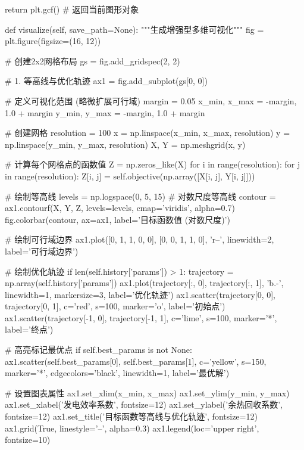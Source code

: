 \documentclass[a4paper,12pt]{article}
\begin{document}
\begin{python}
        return plt.gcf()  # 返回当前图形对象

    def visualize(self, save_path=None):
        """生成增强型多维可视化"""
        fig = plt.figure(figsize=(16, 12))
        
        # 创建2x2网格布局
        gs = fig.add_gridspec(2, 2)
        
        # 1. 等高线与优化轨迹
        ax1 = fig.add_subplot(gs[0, 0])
        
        # 定义可视化范围 (略微扩展可行域)
        margin = 0.05
        x_min, x_max = -margin, 1.0 + margin
        y_min, y_max = -margin, 1.0 + margin
        
        # 创建网格
        resolution = 100
        x = np.linspace(x_min, x_max, resolution)
        y = np.linspace(y_min, y_max, resolution)
        X, Y = np.meshgrid(x, y)
        
        # 计算每个网格点的函数值
        Z = np.zeros_like(X)
        for i in range(resolution):
            for j in range(resolution):
                Z[i, j] = self.objective(np.array([X[i, j], Y[i, j]]))
        
        # 绘制等高线
        levels = np.logspace(0, 5, 15)  # 对数尺度等高线
        contour = ax1.contourf(X, Y, Z, levels=levels, cmap='viridis', alpha=0.7)
        fig.colorbar(contour, ax=ax1, label='目标函数值 (对数尺度)')
        
        # 绘制可行域边界
        ax1.plot([0, 1, 1, 0, 0], [0, 0, 1, 1, 0], 'r--', linewidth=2, label='可行域边界')
        
        # 绘制优化轨迹
        if len(self.history['params']) > 1:
            trajectory = np.array(self.history['params'])
            ax1.plot(trajectory[:, 0], trajectory[:, 1], 'b.-', linewidth=1, markersize=3, label='优化轨迹')
            ax1.scatter(trajectory[0, 0], trajectory[0, 1], c='red', s=100, marker='o', label='初始点')
            ax1.scatter(trajectory[-1, 0], trajectory[-1, 1], c='lime', s=100, marker='*', label='终点')
            
            # 高亮标记最优点
            if self.best_params is not None:
                ax1.scatter(self.best_params[0], self.best_params[1], c='yellow', s=150, 
                           marker='*', edgecolors='black', linewidth=1, label='最优解')
        
        # 设置图表属性
        ax1.set_xlim(x_min, x_max)
        ax1.set_ylim(y_min, y_max)
        ax1.set_xlabel('发电效率系数', fontsize=12)
        ax1.set_ylabel('余热回收系数', fontsize=12)
        ax1.set_title('目标函数等高线与优化轨迹', fontsize=12)
        ax1.grid(True, linestyle='--', alpha=0.3)
        ax1.legend(loc='upper right', fontsize=10)
        

\end{python}
\end{document}
